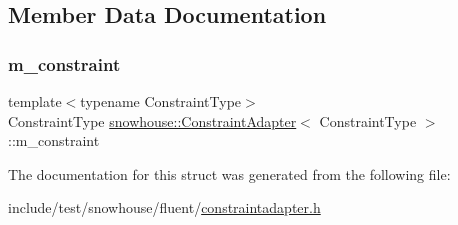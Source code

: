 \subsection{Member Data Documentation}
\mbox{\label{structsnowhouse_1_1ConstraintAdapter_a72840068bf7c504838afb90c842248ba}} 
\subsubsection{\texorpdfstring{m\_constraint}{m\_constraint}}
{\footnotesize\ttfamily template$<$typename Constraint\+Type$>$ \\
Constraint\+Type \mbox{\hyperlink{structsnowhouse_1_1ConstraintAdapter}{snowhouse\+::\+Constraint\+Adapter}}$<$ Constraint\+Type $>$\+::m\+\_\+constraint}



The documentation for this struct was generated from the following file\+:\begin{DoxyCompactItemize}
\item 
include/test/snowhouse/fluent/\mbox{\hyperlink{constraintadapter_8h}{constraintadapter.\+h}}\end{DoxyCompactItemize}
